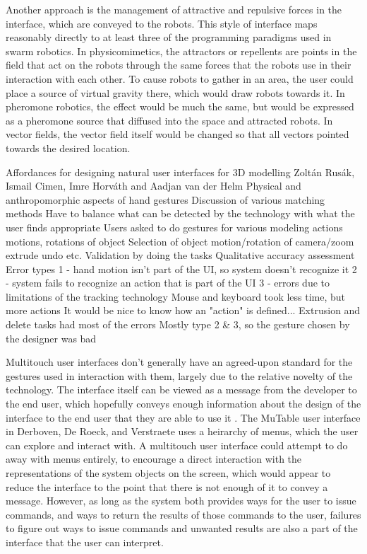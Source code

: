Another approach is the management of attractive and repulsive forces in the interface, which are conveyed to the robots. 
This style of interface maps reasonably directly to at least three of the programming paradigms used in swarm robotics. 
In physicomimetics, the attractors or repellents are points in the field that act on the robots through the same forces that the robots use in their interaction with each other. 
To cause robots to gather in an area, the user could place a source of virtual gravity there, which would draw robots towards it. 
In pheromone robotics, the effect would be much the same, but would be expressed as a pheromone source that diffused into the space and attracted robots. 
In vector fields, the vector field itself would be changed so that all vectors pointed towards the desired location. 

\citep{rusak2016affordances}
Affordances for designing natural user interfaces for 3D modelling
Zoltán Rusák, Ismail Cimen, Imre Horváth and Aadjan van der Helm
	Physical and anthropomorphic aspects of hand gestures
	Discussion of various matching methods
	Have to balance what can be detected by the technology with what the user finds appropriate
	Users asked to do gestures for various modeling actions
		motions, rotations of object
		Selection of object
		motion/rotation of camera/zoom
		extrude
		undo
		etc.
	Validation by doing the tasks
		Qualitative accuracy assessment
	Error types
		1 - hand motion isn't part of the UI, so system doesn't recognize it
		2 - system fails to recognize an action that is part of the UI
		3 - errors due to limitations of the tracking technology
	Mouse and keyboard took less time, but more actions
		It would be nice to know how an "action" is defined...
	Extrusion and delete tasks had most of the errors
		Mostly type 2 \& 3, so the gesture chosen by the designer was bad


Multitouch user interfaces don't generally have an agreed-upon standard for the gestures used in interaction with them, largely due to the relative novelty of the technology. 
The interface itself can be viewed as a message from the developer to the end user, which hopefully conveys enough information about the design of the interface to the end user that they are able to use it \citep{derboven2012semiotic}. 
The MuTable user interface in Derboven, De Roeck, and Verstraete uses a heirarchy of menus, which the user can explore and interact with. 
A multitouch user interface could attempt to do away with menus entirely, to encourage a direct interaction with the representations of the system objects on the screen, which would appear to reduce the interface to the point that there is not enough of it to convey a message. 
However, as long as the system both provides ways for the user to issue commands, and ways to return the results of those commands to the user, failures to figure out ways to issue commands and unwanted results are also a part of the interface that the user can interpret. 


